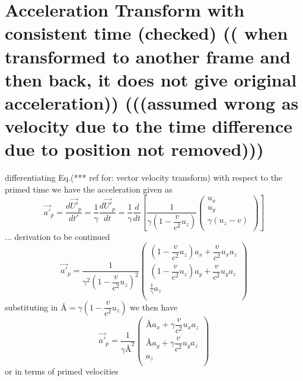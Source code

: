 \section{Acceleration Transform with consistent time (checked) (( when transformed to another frame and then back, it does not give original acceleration)) (((assumed wrong as velocity due to the time difference due to position not removed)))}
differentiating Eq.(*** ref for: vector velocity transform) with respect to the primed time we have the acceleration given as
\begin{equation}%
    \Vec{a'}_p= \dfrac{d\Vec{U'}_p}{dt'} = \dfrac{1}{\gamma}\dfrac{d\Vec{U'}_p}{dt} =  \dfrac{1}{\gamma}\dfrac{d}{dt} \left[ \dfrac{1}{\gamma\left(1- \dfrac{v}{c^2} u_z\right) }\begin{pmatrix}
    u_x \\ u_y  \\ \gamma \left( u_z  - v  \right) \\
    \end{pmatrix} \right]
\end{equation}%
... derivation to be continued
\begin{equation}%
    \Vec{a'}_p=  \dfrac{1}{\gamma^2\left(1- \dfrac{v}{c^2} u_z\right)^2 }\begin{pmatrix}
    \left(1- \dfrac{v}{c^2} u_z\right) a_x + \dfrac{v}{c^2} u_x a_z \\ \left(1- \dfrac{v}{c^2} u_z\right) a_y + \dfrac{v}{c^2} u_y a_z  \\ \frac{1}{\gamma} a_z \\
    \end{pmatrix}
\end{equation}%
substituting in $\text{\AA}= \gamma\left(1- \dfrac{v}{c^2} u_z\right)$ we then have
\begin{equation}%
    \Vec{a'}_p=  \dfrac{1}{\gamma\text{\AA}^2 }\begin{pmatrix}
    \text{\AA} a_x + \gamma \dfrac{v}{c^2} u_x a_z \\
    \text{\AA} a_y + \gamma \dfrac{v}{c^2} u_y a_z  \\
     a_z \\
    \end{pmatrix}
\end{equation}%
or in terms of primed velocities
